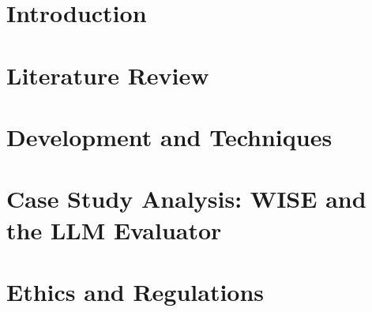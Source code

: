 \documentclass[a4paper,twoside]{book}
\begin{document}


\chapter{Introduction}


\chapter{Literature Review}


\chapter{Development and Techniques}


\chapter{Case Study Analysis: WISE and the LLM Evaluator}


\chapter{Ethics and Regulations}



\end{document}
